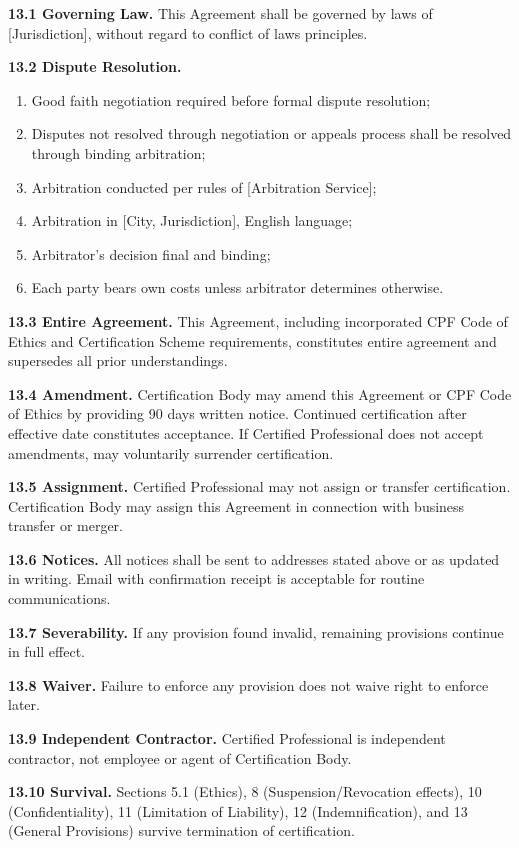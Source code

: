 \documentclass[11pt,a4paper]{article}
\begin{document}
\textbf{13.1 Governing Law.} This Agreement shall be governed by laws of [Jurisdiction], without regard to conflict of laws principles.

\textbf{13.2 Dispute Resolution.}

\begin{enumerate}[label=\alph*)]
\item Good faith negotiation required before formal dispute resolution;
\item Disputes not resolved through negotiation or appeals process shall be resolved through binding arbitration;
\item Arbitration conducted per rules of [Arbitration Service];
\item Arbitration in [City, Jurisdiction], English language;
\item Arbitrator's decision final and binding;
\item Each party bears own costs unless arbitrator determines otherwise.
\end{enumerate}

\textbf{13.3 Entire Agreement.} This Agreement, including incorporated CPF Code of Ethics and Certification Scheme requirements, constitutes entire agreement and supersedes all prior understandings.

\textbf{13.4 Amendment.} Certification Body may amend this Agreement or CPF Code of Ethics by providing 90 days written notice. Continued certification after effective date constitutes acceptance. If Certified Professional does not accept amendments, may voluntarily surrender certification.

\textbf{13.5 Assignment.} Certified Professional may not assign or transfer certification. Certification Body may assign this Agreement in connection with business transfer or merger.

\textbf{13.6 Notices.} All notices shall be sent to addresses stated above or as updated in writing. Email with confirmation receipt is acceptable for routine communications.

\textbf{13.7 Severability.} If any provision found invalid, remaining provisions continue in full effect.

\textbf{13.8 Waiver.} Failure to enforce any provision does not waive right to enforce later.

\textbf{13.9 Independent Contractor.} Certified Professional is independent contractor, not employee or agent of Certification Body.

\textbf{13.10 Survival.} Sections 5.1 (Ethics), 8 (Suspension/Revocation effects), 10 (Confidentiality), 11 (Limitation of Liability), 12 (Indemnification), and 13 (General Provisions) survive termination of certification.
\end{document}

